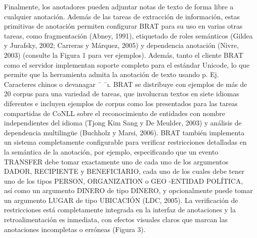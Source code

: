 \begin{description}
Finalmente, los anotadores pueden adjuntar notas de texto de forma libre a cualquier anotación. Además de las tareas de extracción de información, estas primitivas de anotación permiten configurar BRAT para su uso en varias otras tareas, como fragmentación (Abney, 1991), etiquetado de roles semánticos (Gildea y Jurafsky, 2002; Carreras y Márquez, 2005) y dependencia anotación (Nivre, 2003) (consulte la Figura 1 para ver ejemplos). Además, tanto el cliente BRAT como el servidor implementan soporte completo para el estándar Unicode, lo que permite que la herramienta admita la anotación de texto usando p. Ej. Caracteres chinos o devanagar ¯ ¯ı. BRAT se distribuye con ejemplos de más de 20 corpus para una variedad de tareas, que involucran textos en siete idiomas diferentes e incluyen ejemplos de corpus como los presentados para las tareas compartidas de CoNLL sobre el reconocimiento de entidades con nombre independientes del idioma (Tjong Kim Sang y De Meulder, 2003) y análisis de dependencia multilingüe (Buchholz y Marsi, 2006). BRAT también implementa un sistema completamente configurable para verificar restricciones detalladas en la semántica de la anotación, por ejemplo, especificando que un evento TRANSFER debe tomar exactamente uno de cada uno de los argumentos DADOR, RECIPIENTE y BENEFICIARIO, cada uno de los cuales debe tener uno de los tipos PERSON, ORGANIZATION o GEO -ENTIDAD POLÍTICA, así como un argumento DINERO de tipo DINERO, y opcionalmente puede tomar un argumento LUGAR de tipo UBICACIÓN (LDC, 2005). La verificación de restricciones está completamente integrada en la interfaz de anotaciones y la retroalimentación es inmediata, con efectos visuales claros que marcan las anotaciones incompletas o erróneas (Figura 3).


\end{description}
